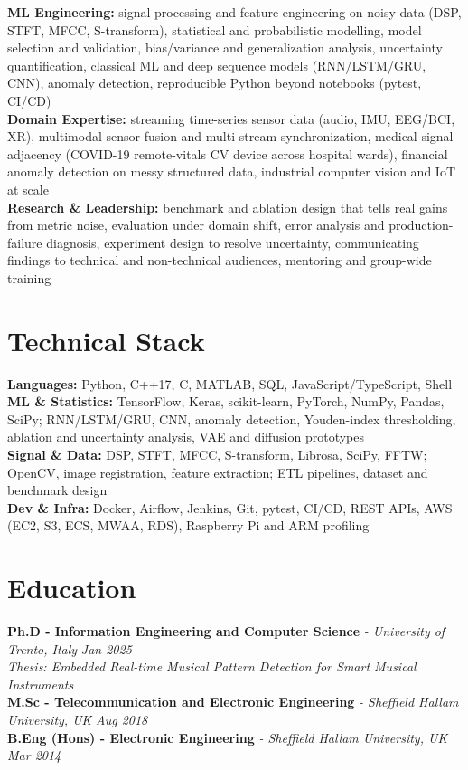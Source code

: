 \documentclass[11pt]{article}
\begin{document}
\textbf{ML Engineering:} signal processing and feature engineering on noisy data (DSP, STFT, MFCC, S-transform), statistical and probabilistic modelling, model selection and validation, bias/variance and generalization analysis, uncertainty quantification, classical ML and deep sequence models (RNN/LSTM/GRU, CNN), anomaly detection, reproducible Python beyond notebooks (pytest, CI/CD)\\
\textbf{Domain Expertise:} streaming time-series sensor data (audio, IMU, EEG/BCI, XR), multimodal sensor fusion and multi-stream synchronization, medical-signal adjacency (COVID-19 remote-vitals CV device across hospital wards), financial anomaly detection on messy structured data, industrial computer vision and IoT at scale\\
\textbf{Research \& Leadership:} benchmark and ablation design that tells real gains from metric noise, evaluation under domain shift, error analysis and production-failure diagnosis, experiment design to resolve uncertainty, communicating findings to technical and non-technical audiences, mentoring and group-wide training

\section*{Technical Stack}

\textbf{Languages:} Python, C++17, C, MATLAB, SQL, JavaScript/TypeScript, Shell\\
\textbf{ML \& Statistics:} TensorFlow, Keras, scikit-learn, PyTorch, NumPy, Pandas, SciPy; RNN/LSTM/GRU, CNN, anomaly detection, Youden-index thresholding, ablation and uncertainty analysis, VAE and diffusion prototypes\\
\textbf{Signal \& Data:} DSP, STFT, MFCC, S-transform, Librosa, SciPy, FFTW; OpenCV, image registration, feature extraction; ETL pipelines, dataset and benchmark design\\
\textbf{Dev \& Infra:} Docker, Airflow, Jenkins, Git, pytest, CI/CD, REST APIs, AWS (EC2, S3, ECS, MWAA, RDS), Raspberry Pi and ARM profiling

\section*{Education}
\textbf{Ph.D - Information Engineering and Computer Science} \textit{\small{ - University of Trento, Italy}} \hfill \textit{Jan 2025}\\[2pt]
\noindent\textit{\small Thesis: Embedded Real-time Musical Pattern Detection for Smart Musical Instruments}\\[3pt]
\noindent\textbf{M.Sc - Telecommunication and Electronic Engineering} \textit{\small{ - Sheffield Hallam University, UK}} \hfill \textit{Aug 2018}\\[3pt]
\noindent\textbf{B.Eng (Hons) - Electronic Engineering} \textit{\small{ - Sheffield Hallam University, UK}} \hfill \textit{Mar 2014}
\end{document}

